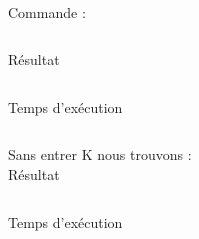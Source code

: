 \documentclass{article}
\begin{document}
\paragraph{}
Commande :
\begin{verbatim}
\end{verbatim}
Résultat
 \begin{verbatim}
\end{verbatim}
Temps d'exécution
\begin{verbatim}
\end{verbatim}
Sans entrer K nous trouvons :\\
Résultat
\begin{verbatim}

\end{verbatim}
Temps d'exécution
\end{document}
